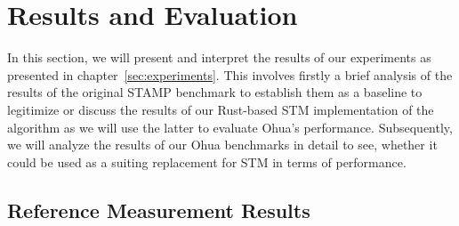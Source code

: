 %
\chapter{Results and Evaluation}
\label{sec:evaluation}

In this section, we will present and interpret the results of our experiments as presented in chapter~\ref{sec:experiments}.
This involves firstly a brief analysis of the results of the original STAMP benchmark to establish them as a baseline to legitimize or discuss the results of our Rust-based STM implementation of the algorithm as we will use the latter to evaluate Ohua's performance.
Subsequently, we will analyze the results of our Ohua benchmarks in detail to see, whether it could be used as a suiting replacement for STM in terms of performance.

\section{Reference Measurement Results}

